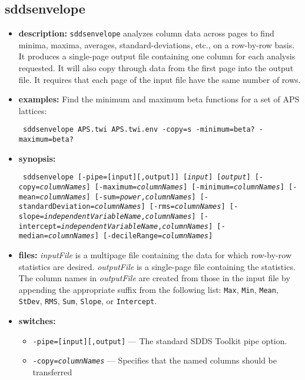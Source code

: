 \begin{latexonly}
\newpage
\end{latexonly}
\subsection{sddsenvelope}
\label{sddsenvelope}

\begin{itemize}
\item {\bf description:}
{\tt sddsenvelope} analyzes column data across pages to find minima,
maxima, averages, standard-deviations, etc., on a row-by-row basis.
It produces a single-page output file containing one column for each analysis
requested.  It will also copy through data from the first page into the output file.
It requires that each page of the input file have the same number of rows.
\item {\bf examples:}
Find the minimum and maximum beta functions for a set of APS lattices:
\begin{flushleft}{\tt
sddsenvelope APS.twi APS.twi.env -copy=s -minimum=beta? -maximum=beta?
}\end{flushleft}
\item {\bf synopsis:}
\begin{flushleft}{\tt
sddsenvelope [-pipe=[input][,output]] [{\em input}] [{\em output}] [-copy={\em columnNames}] 
[-maximum={\em columnNames}] [-minimum={\em columnNames}] 
[-mean={\em columnNames}] [-sum={\em power},{\em columnNames}] 
[-standardDeviation={\em columnNames}] [-rms={\em columnNames}] 
[-slope={\em independentVariableName},{\em columnNames}]
[-intercept={\em independentVariableName},{\em columnNames}] 
[-median={\em columnNames}] [-decileRange={\em columnNames}]
}\end{flushleft}
\item {\bf files:}
      {\em inputFile} is a multipage file containing the data for which row-by-row 
      statistics are desired.  {\em outputFile} is a single-page file containing the    
      statistics.  The column names in {\em outputFile} are created from those in the
      input file by appending the appropriate suffix from the following list:
      {\tt Max}, {\tt Min}, {\tt Mean}, {\tt StDev}, {\tt RMS}, {\tt Sum}, {\tt Slope}, or
      {\tt Intercept}.
\item {\bf switches:}
    \begin{itemize}
    \item {\tt -pipe=[input][,output]} --- The standard SDDS Toolkit pipe option.
    \item {\tt -copy={\em columnNames}} --- Specifies that the named columns should be transferred

\end{itemize}
\end{itemize}
